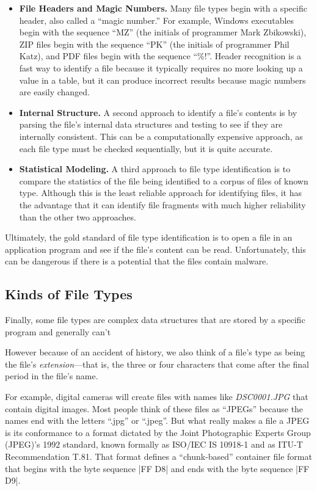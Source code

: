 \begin{itemize}
\item \textbf{File Headers and Magic Numbers.} Many file types begin
  with a specific header, also called a ``magic number.'' For example,
  Windows executables begin with the sequence ``MZ'' (the initials of
  programmer Mark Zbikowski), ZIP files begin with the sequence ``PK''
  (the initials of programmer Phil Katz), and PDF files begin with the
  sequence ``\%!''.  Header recognition is a fast way to identify a
  file because it typically requires no more looking up a value in a
  table, but it can produce incorrect results because magic numbers are easily
  changed. 
\item \textbf{Internal Structure.} A second approach to identify a
  file's contents is by parsing the file's internal data structures
  and testing to see if they are internally consistent. This can be a
  computationally expensive approach, as each file type must be
  checked sequentially, but it is quite accurate.

\item \textbf{Statistical Modeling.} A third approach to file type
 identification is to compare the statistics of the file being
 identified to a corpus of files of known type. Although this is the
 least reliable approach for identifying files, it has the advantage
 that it can identify file fragments with much higher reliability than
 the other two approaches.
\end{itemize}

Ultimately, the gold standard of file type identification is to open a
file in an application program and see if the file's content can be
read. Unfortunately, this can be dangerous if there is a potential
that the files contain malware.

\subsection{Kinds of File Types}



Finally, some file
types are complex data structures that are stored by a specific
program and generally can't 

However
because of an accident of history, we also think of a file's type as
being the file's \emph{extension}---that is, the three or four
characters that come after the final period in the file's name.

For example, digital cameras will create files with names like
\emph{DSC0001.JPG} that contain digital images. Most people think of
these files as ``JPEGs'' because the names end with the letters ``.jpg'' or
``.jpeg''.  But what really makes a file a JPEG is
its conformance to a format dictated by the Joint Photographic Experts
Group (JPEG)'s 1992 standard, known formally as ISO/IEC IS 10918-1 and
as ITU-T Recommendation T.81. That format defines a ``chunk-based''
container file format that begins with the byte sequence |FF D8| and
ends with the byte sequence |FF D9|.

